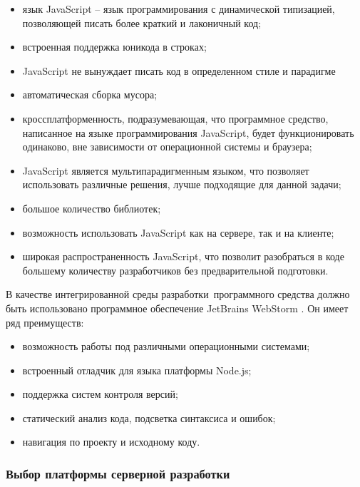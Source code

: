 \begin{itemize}
  \item язык JavaScript -- язык программирования с динамической типизацией, позволяющей писать более краткий и лаконичный код;
  \item встроенная поддержка юникода в строках;
  \item JavaScript не вынуждает писать код в определенном стиле и парадигме
  \item автоматическая сборка мусора;
  \item кроссплатформенность, подразумевающая, что программное средство, написанное на языке программирования JavaScript, будет функционировать одинаково, вне зависимости от операционной системы и браузера;
  \item JavaScript является мультипарадигменным языком, что позволяет использовать различные решения, лучше подходящие для данной задачи;
  \item большое количество библиотек;
  \item возможность использовать JavaScript как на сервере, так и на клиенте;
  \item широкая распространенность JavaScript, что позволит разобраться в коде большему количеству разработчиков без предварительной подготовки.
\end{itemize}

В качестве интегрированной среды разработки программного средства должно быть использовано программное обеспечение JetBrains WebStorm \cite{webstorm}. Он имеет ряд преимуществ:
\begin{itemize}
  \item возможность работы под различными операционными системами;
  \item встроенный отладчик для языка платформы Node.js;
  \item поддержка систем контроля версий;
  \item статический анализ кода, подсветка синтаксиса и ошибок;
  \item навигация по проекту и исходному коду.
\end{itemize}

\subsubsection{Выбор платформы серверной разработки}

